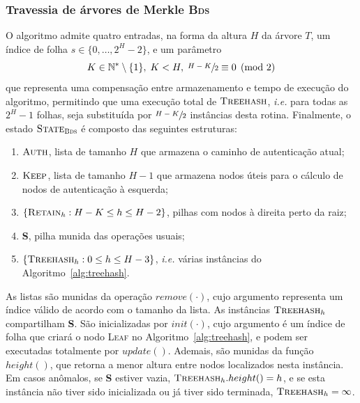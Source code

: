\documentclass{ufsctex/ufsctex}
\newcommand{\bds}{\textsc{Bds}}
\begin{document}
\subsubsection{Travessia de árvores de Merkle \bds{}}\label{subsubsection:bds}

O algoritmo admite quatro entradas, na forma da altura $H$ da árvore $T$, um
índice de folha $s \in \{0, \dots, 2^{H} - 2\}$, e um parâmetro
\begin{equation}\label{eq:kparam}
  K \in \mathbb{N}^{*} \setminus \{1\},
    \; K < H, \; \sfrac{H - K}{2} \equiv 0 \pmod{2}
\end{equation}
que representa uma compensação entre armazenamento e tempo de execução do
algoritmo, permitindo que uma execução total de $\textsc{Treehash}$,
\emph{i.e.} para todas as $2^H - 1$ folhas, seja substituída por $\sfrac{H -
K}{2}$ instâncias desta rotina. Finalmente, o estado $\textsc{State}_{\bds{}}$ é
composto das seguintes estruturas:

\begin{enumerate}[label= (\roman*)]

  \item $\textsc{Auth}$, lista de tamanho $H$ que armazena o caminho de
      autenticação atual;

  \item $\textsc{Keep}$, lista de tamanho $H - 1$ que armazena nodos úteis para
      o cálculo de nodos de autenticação à esquerda;

  \item $\{\textsc{Retain}_{h} : H - K \leq h \leq H - 2\}$, pilhas com nodos
      à direita perto da raiz;

  \item \textbf{S}, pilha munida das operações usuais;

  \item $\{\textsc{Treehash}_{h} : 0 \leq h \leq H - 3\}$, \emph{i.e.} várias
      instâncias do Algoritmo~\ref{alg:treehash}.

\end{enumerate}

As listas são munidas da operação $remove(\cdot)$, cujo argumento representa um
índice válido de acordo com o tamanho da lista. As instâncias
$\textsc{Treehash}_{h}$ compartilham \textbf{S}. São inicializadas por
$init(\cdot)$, cujo argumento é um índice de folha que criará o nodo
\textsc{Leaf} no Algoritmo~\ref{alg:treehash}, e podem ser executadas
totalmente por $update()$. Ademais, são munidas da função $height()$, que
retorna a menor altura entre nodos localizados nesta instância. Em casos
anômalos, se \textbf{S} estiver vazia, $\textsc{Treehash}_{h}.height() = h$, e
se esta instância não tiver sido inicializada ou já tiver sido terminada,
$\textsc{Treehash}_{h} = \infty$.
\end{document}
